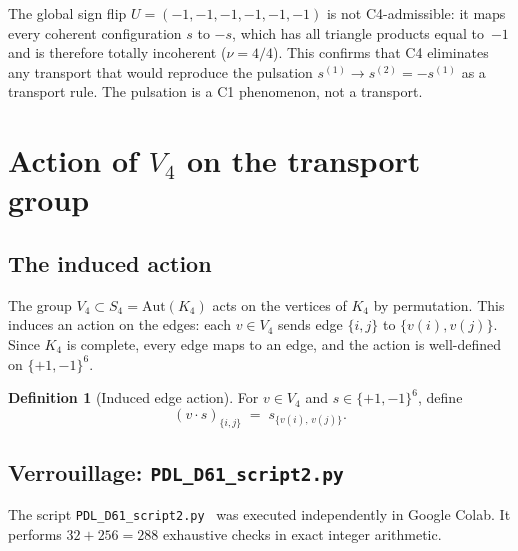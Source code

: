 \documentclass[11pt,a4paper]{article}
\newenvironment{negativebox}[1][]{%
  \begin{tcolorbox}[negativestyle,title={Negative Result%
    \ifx\relax#1\relax\else: #1\fi}]}{\end{tcolorbox}}
\theoremstyle{plain}
\theoremstyle{definition}
\newtheorem{definition}[theorem]{Definition}
\theoremstyle{remark}
\newcommand{\Kfour}{K_4}
\newcommand{\Vfour}{V_4}
\newcommand{\Sfour}{S_4}
\begin{document}
\begin{negativebox}[Global flip is not admissible]
The global sign flip $U = (-1,-1,-1,-1,-1,-1)$ is not C4-admissible: it maps every
coherent configuration $s$ to $-s$, which has all triangle products equal to~$-1$
and is therefore totally incoherent ($\nu = 4/4$). This confirms that C4 eliminates
any transport that would reproduce the pulsation $s^{(1)} \to s^{(2)} = -s^{(1)}$
as a transport rule. The pulsation is a C1 phenomenon, not a transport.
\end{negativebox}

\section{Action of \texorpdfstring{$\Vfour$}{V4} on the transport group}
\label{sec:V4action}

\subsection{The induced action}

The group $\Vfour \subset \Sfour = \mathrm{Aut}(\Kfour)$ acts on the vertices of
$\Kfour$ by permutation. This induces an action on the edges: each $v \in \Vfour$
sends edge $\{i,j\}$ to $\{v(i), v(j)\}$. Since $\Kfour$ is complete, every edge
maps to an edge, and the action is well-defined on $\{+1,-1\}^6$.

\begin{definition}[Induced edge action]
For $v \in \Vfour$ and $s \in \{+1,-1\}^6$, define
\begin{equation}
(v \cdot s)_{\{i,j\}} \;=\; s_{\{v(i),\,v(j)\}}.
\label{eq:induced}
\end{equation}
\end{definition}

\subsection{Verrouillage: \texttt{PDL\_D61\_script2.py}}\label{sec:script2}

The script \texttt{PDL\_D61\_script2.py}~\cite{PDL_D61_script2} was executed
independently in Google Colab. It performs $32 + 256 = 288$ exhaustive checks in
exact integer arithmetic.
\end{document}
